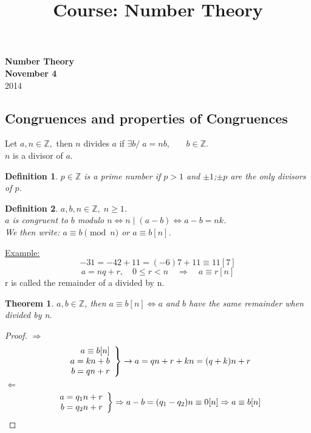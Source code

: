 \documentclass{report}
\title{Course: Number Theory}
\begin{document}
\newtheorem*{defi}{Definition}
\newtheorem*{thm}{Theorem}

{\centering
\Large
\textbf{Number Theory}\\
\normalsize
\textbf{November 4}\\
2014\\
}
\vspace{5mm}
\subsection*{Congruences and properties of Congruences}
Let $a,n \in \mathbb{Z},$ then $n$ divides $a$ if $\exists b/\; a=nb$,$\qquad b \in \mathbb{Z}$.\\
$n$ is a divisor of $a$.
\begin{defi} $p \in \mathbb{Z}$ is a prime number if $p > 1$ and $\pm1$;$\pm p$ are the only divisors of $p$.
\end{defi}
\begin{defi} $a,b,n \in \mathbb{Z}, \; n\geq 1$. \\
$a$ is congruent to $b$ modulo $n \iff n \mid (a-b) \iff a-b=nk$.\\
We then write: $a\equiv b \pmod n$ or $a \equiv b [n]$.
\end{defi}
\underline{Example:}
\[
-31 = -42+11=(-6)7 +11\equiv 11[7]
\]
\[
a=nq+r,\quad 0 \leq r<n \quad \Rightarrow \quad a \equiv r [n]
\]
r is called the remainder of a divided by n.

\begin{thm} $a,b \in \mathbb{Z}$, then $a \equiv b[n] \iff a$ and $b$ have the same remainder when divided by n.
\end{thm}
\begin{proof}
\underline{$\Rightarrow$}
\[
\left.
\begin{array}{r r r}
a \equiv b[n]\\
a=kn+b\\
b=qn+r\\
\end{array}
\right\}
\rightarrow a=qn+r+kn=(q+k)n+r
\]
\underline{$\Leftarrow$}
\[
\left.
\begin{array}{r r r}
a=q_1n+r\\
b=q_2n+r\\
\end{array}
\right \} \Rightarrow a-b=(q_1-q_2)n\equiv0[n] \Rightarrow a\equiv b[n]
\]
\end{proof}
\end{document}
